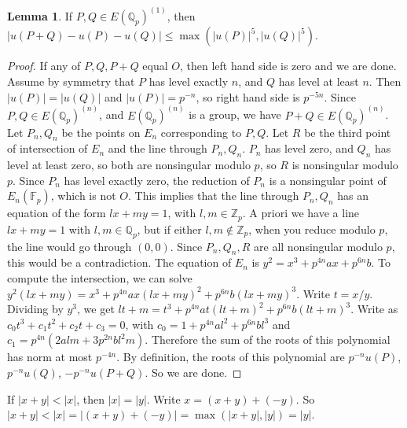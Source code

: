 \documentclass{article}
\newcommand{\F}{\mathbb{F}}
\newcommand{\Z}{\mathbb{Z}}
\newcommand{\Q}{\mathbb{Q}}
\newcommand{\rb}[1]{\left( #1 \right)}
\newcommand{\abs}[1]{\left\lvert #1 \right\rvert}
\theoremstyle{definition}\newtheorem{definition}{Definition}[section]
\theoremstyle{definition}\newtheorem{remark}[definition]{Remark}
\theoremstyle{definition}\newtheorem*{example}{Example}
\theoremstyle{definition}\newtheorem*{note}{Note}
\newtheorem{lemma}[definition]{Lemma}
\begin{document}
\begin{lemma}
\label{lem:7.5}
If $ P, Q \in E\rb{\Q_p}^{\rb{1}} $, then $ \abs{u\rb{P + Q} - u\rb{P} - u\rb{Q}} \le \max\rb{\abs{u\rb{P}}^5, \abs{u\rb{Q}}^5} $.
\end{lemma}

\begin{proof}
If any of $ P, Q, P + Q $ equal $ O $, then left hand side is zero and we are done. Assume by symmetry that $ P $ has level exactly $ n $, and $ Q $ has level at least $ n $. Then $ \abs{u\rb{P}} = \abs{u\rb{Q}} $ and $ \abs{u\rb{P}} = p^{-n} $, so right hand side is $ p^{-5n} $. Since $ P, Q \in E\rb{\Q_p}^{\rb{n}} $, and $ E\rb{\Q_p}^{\rb{n}} $ is a group, we have $ P + Q \in E\rb{\Q_p}^{\rb{n}} $. Let $ P_n, Q_n $ be the points on $ E_n $ corresponding to $ P, Q $. Let $ R $ be the third point of intersection of $ E_n $ and the line through $ P_n, Q_n $. $ P_n $ has level zero, and $ Q_n $ has level at least zero, so both are nonsingular modulo $ p $, so $ R $ is nonsingular modulo $ p $. Since $ P_n $ has level exactly zero, the reduction of $ P_n $ is a nonsingular point of $ E_n\rb{\F_p} $, which is not $ O $. This implies that the line through $ P_n, Q_n $ has an equation of the form $ lx + my = 1 $, with $ l, m \in \Z_p $. A priori we have a line $ lx + my = 1 $ with $ l, m \in \Q_p $, but if either $ l, m \notin \Z_p $, when you reduce modulo $ p $, the line would go through $ \rb{0, 0} $. Since $ P_n, Q_n, R $ are all nonsingular modulo $ p $, this would be a contradiction. The equation of $ E_n $ is $ y^2 = x^3 + p^{4n}ax + p^{6n}b $. To compute the intersection, we can solve $ y^2\rb{lx + my} = x^3 + p^{4n}ax\rb{lx + my}^2 + p^{6n}b\rb{lx + my}^3 $. Write $ t = x / y $. Dividing by $ y^3 $, we get $ lt + m = t^3 + p^{4n}at\rb{lt + m}^2 + p^{6n}b\rb{lt + m}^3 $. Write as $ c_0t^3 + c_1t^2 + c_2t + c_3 = 0 $, with $ c_0 = 1 + p^{4n}al^2 + p^{6n}bl^3 $ and $ c_1 = p^{4n}\rb{2alm + 3p^{2n}bl^2m} $. Therefore the sum of the roots of this polynomial has norm at most $ p^{-4n} $. By definition, the roots of this polynomial are $ p^{-n}u\rb{P} $, $ p^{-n}u\rb{Q} $, $ -p^{-n}u\rb{P + Q} $. So we are done.
\end{proof}


If $ \abs{x + y} < \abs{x} $, then $ \abs{x} = \abs{y} $. Write $ x = \rb{x + y} + \rb{-y} $. So $ \abs{x + y} < \abs{x} = \abs{\rb{x + y} + \rb{-y}} = \max\rb{\abs{x + y}, \abs{y}} = \abs{y} $.
\end{document}
